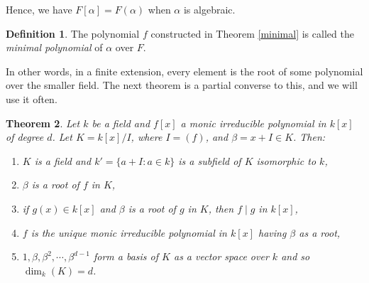 \documentclass[12pt]{report}
\newtheorem{thm}{Theorem}[section]
\theoremstyle{definition}
\newtheorem{defn}[thm]{Definition}
\def\aa{\alpha}
\begin{document}
Hence, we have $F[\aa]=F(\aa)$ when $\aa$ is algebraic.

\begin{defn}
    The polynomial $f$ constructed in Theorem \ref{minimal} is called the \emph{minimal polynomial} of $\aa$ over $F$.
\end{defn}

In other words, in a finite extension, every element is the root of some polynomial over the smaller field. The next theorem is a partial converse to this, and we will use it often.

\begin{thm}\label{stem}
    Let $k$ be a field and $f[x]$ a monic irreducible polynomial in $k[x]$ of degree $d$. Let $K=k[x]/I$, where $I=(f)$, and $\beta = x+I\in K$. Then:
    \begin{enumerate}
        \item $K$ is a field and $k'=\{a+I: a\in k\}$ is a subfield of $K$ isomorphic to $k$,
        \item $\beta$ is a root of $f$ in $K$,
        \item if $g(x)\in k[x]$ and $\beta$ is a root of $g$ in $K$, then $f\mid g$ in $k[x]$,
        \item $f$ is the unique monic irreducible polynomial in $k[x]$ having $\beta$ as a root,
        \item $1,\beta,\beta^2,\cdots,\beta^{d-1}$ form a basis of $K$ as a vector space over $k$ and so $\dim_k(K)=d$.
    \end{enumerate}
\end{thm}
\end{document}
